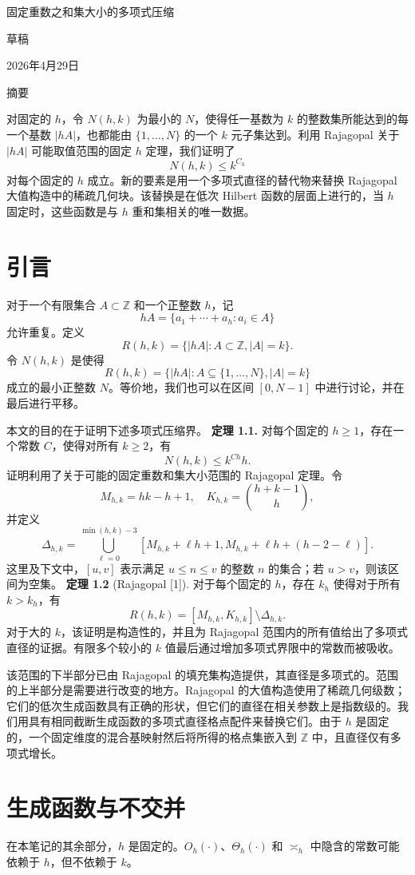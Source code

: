 \documentclass[11pt]{article}
\theoremstyle{break}
\begin{document}
固定重数之和集大小的多项式压缩

草稿

2026年4月29日

摘要

对固定的 $h$，令 $N(h,k)$ 为最小的 $N$，使得任一基数为 $k$ 的整数集所能达到的每一个基数 $|hA|$，也都能由 $\{1,\dots,N\}$ 的一个 $k$ 元子集达到。利用 Rajagopal 关于 $|hA|$ 可能取值范围的固定 $h$ 定理，我们证明了
\[N(h,k) \le k^{C_h}\]
对每个固定的 $h$ 成立。新的要素是用一个多项式直径的替代物来替换 Rajagopal 大值构造中的稀疏几何块。该替换是在低次 Hilbert 函数的层面上进行的，当 $h$ 固定时，这些函数是与 $h$ 重和集相关的唯一数据。
\section{引言}

对于一个有限集合 \(A \subset \mathbb{Z}\) 和一个正整数 \(h\)，记
\[hA = \{a_1 + \cdots + a_h : a_i \in A\}\]
允许重复。定义
\[R(h,k) = \{|hA| : A \subset \mathbb{Z}, |A| = k\}.\]
令 \(N(h,k)\) 是使得
\[R(h,k) = \{|hA| : A \subseteq \{1,\dots,N\}, |A| = k\}\]
成立的最小正整数 \(N\)。等价地，我们也可以在区间 \([0, N-1]\) 中进行讨论，并在最后进行平移。

本文的目的在于证明下述多项式压缩界。
\textbf{定理 1.1.} 对每个固定的 $h \geq 1$，存在一个常数 $C$，使得对所有 $k \geq 2$，有
\[ N(h,k) \leq k^{C h} h. \]
证明利用了关于可能的固定重数和集大小范围的 Rajagopal 定理。令
\[ M_{h,k} = hk - h + 1, \quad K_{h,k} = \binom{h+k-1}{h}, \]
并定义
\[ \Delta_{h,k} = \bigcup_{\ell=0}^{\min(h,k)-3} [M_{h,k} + \ell h + 1, M_{h,k} + \ell h + (h-2-\ell)]. \]
这里及下文中，$[u,v]$ 表示满足 $u \leq n \leq v$ 的整数 $n$ 的集合；若 $u > v$，则该区间为空集。
\textbf{定理 1.2} (Rajagopal [1]). 对于每个固定的 $h$，存在 $k_h$ 使得对于所有 $k > k_h$，有 \[ R(h,k) = [M_{h,k}, K_{h,k}] \setminus \Delta_{h,k}. \] 对于大的 $k$，该证明是构造性的，并且为 Rajagopal 范围内的所有值给出了多项式直径的证据。有限多个较小的 $k$ 值最后通过增加多项式界限中的常数而被吸收。

该范围的下半部分已由 Rajagopal 的填充集构造提供，其直径是多项式的。范围的上半部分是需要进行改变的地方。Rajagopal 的大值构造使用了稀疏几何级数；它们的低次生成函数具有正确的形状，但它们的直径在相关参数上是指数级的。我们用具有相同截断生成函数的多项式直径格点配件来替换它们。由于 $h$ 是固定的，一个固定维度的混合基映射然后将所得的格点集嵌入到 $\mathbb{Z}$ 中，且直径仅有多项式增长。
\section{生成函数与不交并}
在本笔记的其余部分，$h$ 是固定的。$O_h(\cdot)$、$\Theta_h(\cdot)$ 和 $\asymp_h$ 中隐含的常数可能依赖于 $h$，但不依赖于 $k$。
\end{document}
